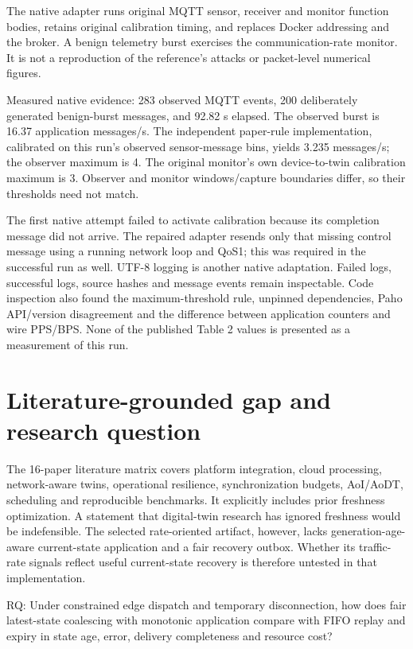 \documentclass[11pt,a4paper]{article}
\begin{document}
The native adapter runs original MQTT sensor, receiver and monitor function bodies, retains original calibration timing, and replaces Docker addressing and the broker. A benign telemetry burst exercises the communication-rate monitor. It is not a reproduction of the reference's attacks or packet-level numerical figures.


Measured native evidence: 283 observed MQTT events, 200 deliberately generated benign-burst messages, and 92.82 s elapsed. The observed burst is 16.37 application messages/s. The independent paper-rule implementation, calibrated on this run's observed sensor-message bins, yields 3.235 messages/s; the observer maximum is 4. The original monitor's own device-to-twin calibration maximum is 3. Observer and monitor windows/capture boundaries differ, so their thresholds need not match.


The first native attempt failed to activate calibration because its completion message did not arrive. The repaired adapter resends only that missing control message using a running network loop and QoS1; this was required in the successful run as well. UTF-8 logging is another native adaptation. Failed logs, successful logs, source hashes and message events remain inspectable. Code inspection also found the maximum-threshold rule, unpinned dependencies, Paho API/version disagreement and the difference between application counters and wire PPS/BPS. None of the published Table 2 values is presented as a measurement of this run.


\section{Literature-grounded gap and research question}

The 16-paper literature matrix covers platform integration, cloud processing, network-aware twins, operational resilience, synchronization budgets, AoI/AoDT, scheduling and reproducible benchmarks. It explicitly includes prior freshness optimization. A statement that digital-twin research has ignored freshness would be indefensible. The selected rate-oriented artifact, however, lacks generation-age-aware current-state application and a fair recovery outbox. Whether its traffic-rate signals reflect useful current-state recovery is therefore untested in that implementation.\cite{ref2,ref3,ref4,ref6,ref7,ref8,ref9,ref11,ref14,ref15,ref16}


RQ: Under constrained edge dispatch and temporary disconnection, how does fair latest-state coalescing with monotonic application compare with FIFO replay and expiry in state age, error, delivery completeness and resource cost?
\end{document}

